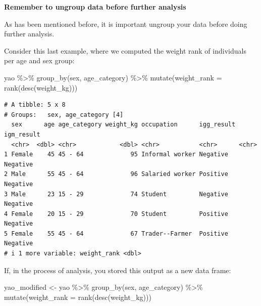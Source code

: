 \documentclass[
  letterpaper,
  DIV=11,
  numbers=noendperiod]{scrreprt}
\newenvironment{Shaded}{\begin{snugshade}}{\end{snugshade}}
\newcommand{\AttributeTok}[1]{\textcolor[rgb]{0.40,0.45,0.13}{#1}}
\newcommand{\FunctionTok}[1]{\textcolor[rgb]{0.28,0.35,0.67}{#1}}
\newcommand{\NormalTok}[1]{\textcolor[rgb]{0.00,0.23,0.31}{#1}}
\newcommand{\OtherTok}[1]{\textcolor[rgb]{0.00,0.23,0.31}{#1}}
\newcommand{\SpecialCharTok}[1]{\textcolor[rgb]{0.37,0.37,0.37}{#1}}
\begin{document}
\begin{tcolorbox}[enhanced jigsaw, colframe=quarto-callout-caution-color-frame, rightrule=.15mm, opacityback=0, breakable, coltitle=black, colbacktitle=quarto-callout-caution-color!10!white, bottomrule=.15mm, leftrule=.75mm, toprule=.15mm, arc=.35mm, bottomtitle=1mm, colback=white, left=2mm, opacitybacktitle=0.6, titlerule=0mm, title=\textcolor{quarto-callout-caution-color}{\faFire}\hspace{0.5em}{Watch Out}, toptitle=1mm]

\textbf{Remember to ungroup data before further analysis}

As has been mentioned before, it is important ungroup your data before
doing further analysis.

Consider this last example, where we computed the weight rank of
individuals per age and sex group:

\begin{Shaded}
\begin{Highlighting}[]
\NormalTok{yao }\SpecialCharTok{\%\textgreater{}\%} 
  \FunctionTok{group\_by}\NormalTok{(sex, age\_category) }\SpecialCharTok{\%\textgreater{}\%} 
  \FunctionTok{mutate}\NormalTok{(}\AttributeTok{weight\_rank =} \FunctionTok{rank}\NormalTok{(}\FunctionTok{desc}\NormalTok{(weight\_kg)))}
\end{Highlighting}
\end{Shaded}

\begin{verbatim}
# A tibble: 5 x 8
# Groups:   sex, age_category [4]
  sex      age age_category weight_kg occupation      igg_result igm_result
  <chr>  <dbl> <chr>            <dbl> <chr>           <chr>      <chr>     
1 Female    45 45 - 64             95 Informal worker Negative   Negative  
2 Male      55 45 - 64             96 Salaried worker Positive   Negative  
3 Male      23 15 - 29             74 Student         Negative   Negative  
4 Female    20 15 - 29             70 Student         Positive   Negative  
5 Female    55 45 - 64             67 Trader--Farmer  Positive   Negative  
# i 1 more variable: weight_rank <dbl>
\end{verbatim}

If, in the process of analysis, you stored this output as a new data
frame:

\begin{Shaded}
\begin{Highlighting}[]
\NormalTok{yao\_modified }\OtherTok{\textless{}{-}} 
\NormalTok{  yao }\SpecialCharTok{\%\textgreater{}\%} 
  \FunctionTok{group\_by}\NormalTok{(sex, age\_category) }\SpecialCharTok{\%\textgreater{}\%} 
  \FunctionTok{mutate}\NormalTok{(}\AttributeTok{weight\_rank =} \FunctionTok{rank}\NormalTok{(}\FunctionTok{desc}\NormalTok{(weight\_kg)))}
\end{Highlighting}
\end{Shaded}


\end{tcolorbox}
\end{document}
